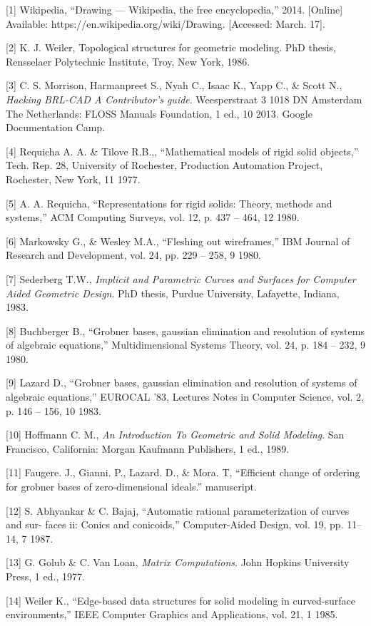 \documentclass[11pt, oneside]{Thesis} %
\begin{document}
[1] Wikipedia, “Drawing — Wikipedia, the free encyclopedia,” 2014. [Online] Available:
https://en.wikipedia.org/wiki/Drawing. [Accessed: March. 17].

[2] K. J. Weiler, Topological structures for geometric modeling. PhD thesis, Rensselaer
Polytechnic Institute, Troy, New York, 1986.

[3] C. S. Morrison, Harmanpreet S., Nyah C., Isaac K., Yapp C., & Scott N., \textit{Hacking
 BRL-CAD A Contributor’s guide}. Weesperstraat 3 1018 DN Amsterdam The
Netherlands: FLOSS Manuals Foundation, 1 ed., 10 2013. Google Documentation Camp.

[4] Requicha A. A. & Tilove R.B.,, “Mathematical models of rigid solid objects,” Tech.
Rep. 28, University of Rochester, Production Automation Project, Rochester, New York, 11 1977.

[5] A. A. Requicha, “Representations for rigid solids: Theory, methods and systems,”
ACM Computing Surveys, vol. 12, p. 437 – 464, 12 1980.

[6] Markowsky G., & Wesley M.A., “Fleshing out wireframes,” IBM Journal of Research
and Development, vol. 24, pp. 229 – 258, 9 1980.

[7] Sederberg T.W., \textit{Implicit and Parametric Curves and Surfaces for Computer Aided
Geometric Design}. PhD thesis, Purdue University, Lafayette, Indiana, 1983.

[8] Buchberger B., “Grobner bases, gaussian elimination and resolution of systems of
algebraic equations,” Multidimensional Systems Theory, vol. 24, p. 184 – 232, 9 1980.

[9] Lazard D., “Grobner bases, gaussian elimination and resolution of systems of algebraic
equations,” EUROCAL ’83, Lectures Notes in Computer Science, vol. 2, p. 146 – 156, 10 1983.

[10] Hoffmann C. M., \textit{An Introduction To Geometric and Solid Modeling}. San Francisco,
California: Morgan Kaufmann Publishers, 1 ed., 1989.

[11] Faugere. J., Gianni. P., Lazard. D., & Mora. T, “Efficient change of ordering for
grobner bases of zero-dimensional ideals.” manuscript.

[12] S. Abhyankar & C. Bajaj, “Automatic rational parameterization of curves and sur-
faces ii: Conics and conicoids,” Computer-Aided Design, vol. 19, pp. 11–14, 7 1987.

[13] G. Golub & C. Van Loan, \textit{Matrix Computations}. John Hopkins University Press, 1 ed., 1977.

[14] Weiler K., “Edge-based data structures for solid modeling in curved-surface environments,”
 IEEE Computer Graphics and Applications, vol. 21, 1 1985.
\end{document}

